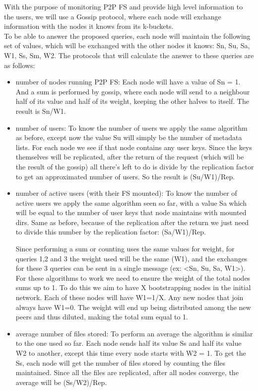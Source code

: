 \documentclass[times,9pt,article]{llncs}
\begin{document}
With the purpose of monitoring P2P FS and provide high level information to the 
users, we will use a Gossip protocol, where each node will exchange information
with the nodes it knows from its k-buckets.\\
To be able to answer the proposed queries, each node will maintain the following
set of values, which will be exchanged with the other nodes it knows: Sn, Su, Sa,
W1, Ss, Sm, W2. The protocols that will calculate the answer to these queries are
as follows:
\begin{itemize}
\item number of nodes running P2P FS:
Each node will have a value of Sn = 1. And a sum is performed by gossip, where each 
node will send to a neighbour half of its value and half of its weight, keeping the 
other halves to itself. The result is Sn/W1.

\item number of users:
To know the number of users we apply the same algorithm as before, except now 
the value Su will simply be the number of metadata lists. For each node we see if
that node contains any user keys. Since the keys themselves will be replicated,
 after the return of the request (which will be the result of the gossip) all
 there's left to do is divide by the replication factor to get an approximated
 number of users. So the result is (Su/W1)/Rep.

\item number of active users (with their FS mounted):
To know the number of active users we apply the same algorithm seen so far, with a
value Sa which will be equal to the number of user keys that node maintains with
mounted dirs. Same as before, because of the replication after the return
we just need to divide this number by the replication factor: (Sa/W1)/Rep.

Since performing a sum or counting uses the same values for weight, for queries 1,2 
and 3 the weight used will be the same (W1), and the exchanges for these 3 queries 
can be sent in a single message (ex: \textless Sn, Su, Sa, W1\textgreater). For these algorithms to work 
we need to ensure the weight of the total nodes sums up to 1. To do this we aim to
have X bootstrapping nodes in the initial network. Each of these nodes will have 
W1=1/X. 
Any new nodes that join always have W1=0. The weight will end up being distributed 
among the new peers and thus diluted, making the total sum equal to 1.

\item average number of files stored:
To perform an average the algorithm is similar to the one used so far. Each node
sends half its value Ss and half its value W2 to another, except this time every 
node starts with W2 = 1. To get the Ss, each node will get the number of files 
stored by counting the files maintained. Since all the files are replicated, after
all nodes converge, the average will be (Ss/W2)/Rep.


\end{itemize}
\end{document}
